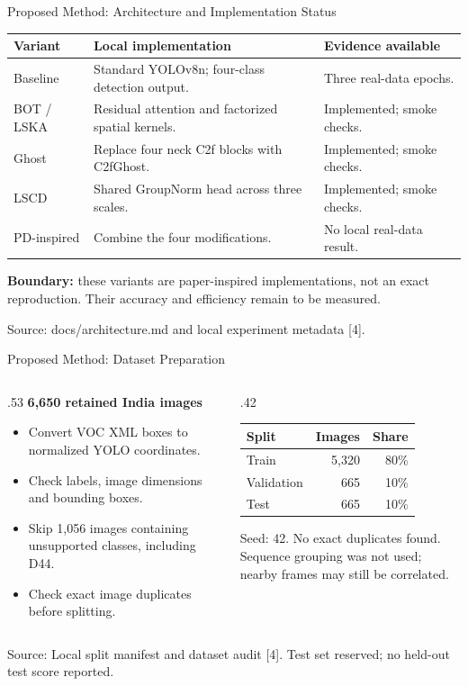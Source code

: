\documentclass[aspectratio=169,11pt]{beamer}
\newcommand{\source}[1]{\par\vfill{\fontsize{7}{9}\selectfont\color{muted}Source: #1\par}}
\newcommand{\lead}[1]{{\large\bfseries\color{teal}#1}\par\medskip}
\begin{document}
\begin{frame}{Proposed Method: Architecture and Implementation Status}
\small
\renewcommand{\arraystretch}{1.4}
\begin{tabular}{p{2.2cm}p{7cm}p{3.6cm}}
\toprule\textbf{Variant} & \textbf{Local implementation} & \textbf{Evidence available}\\\midrule
Baseline & Standard YOLOv8n; four-class detection output. & Three real-data epochs.\\
BOT / LSKA & Residual attention and factorized spatial kernels. & Implemented; smoke checks.\\
Ghost & Replace four neck C2f blocks with C2fGhost. & Implemented; smoke checks.\\
LSCD & Shared GroupNorm head across three scales. & Implemented; smoke checks.\\
PD-inspired & Combine the four modifications. & No local real-data result.\\\bottomrule
\end{tabular}
\medskip
\textbf{Boundary:} these variants are paper-inspired implementations, not an exact reproduction. Their accuracy and efficiency remain to be measured.
\source{docs/architecture.md and local experiment metadata [4].}
\end{frame}

\begin{frame}{Proposed Method: Dataset Preparation}\small
\begin{columns}[T]
\begin{column}{.53\textwidth}
\lead{6,650 retained India images}
\begin{itemize}\setlength\itemsep{3mm}
\item Convert VOC XML boxes to normalized YOLO coordinates.
\item Check labels, image dimensions and bounding boxes.
\item Skip 1,056 images containing unsupported classes, including D44.
\item Check exact image duplicates before splitting.
\end{itemize}
\end{column}
\begin{column}{.42\textwidth}
\renewcommand{\arraystretch}{1.5}
\begin{tabular}{lrr}\toprule
\textbf{Split}&\textbf{Images}&\textbf{Share}\\\midrule
Train&5,320&80\%\\
Validation&665&10\%\\
Test&665&10\%\\\bottomrule
\end{tabular}
\medskip\par
\small Seed: 42. No exact duplicates found.\\[2mm]
Sequence grouping was not used; nearby frames may still be correlated.
\end{column}
\end{columns}
\source{Local split manifest and dataset audit [4]. Test set reserved; no held-out test score reported.}
\end{frame}
\end{document}
